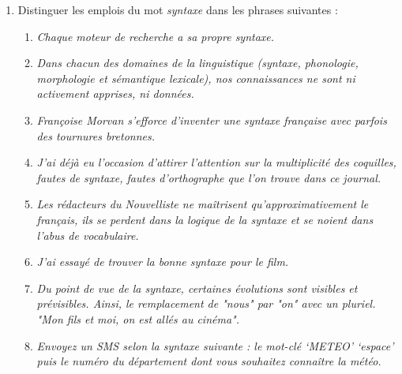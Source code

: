 {\begin{enumerate}[label=\alph*.]
    \item Distinguer les emplois du mot \textit{syntaxe} dans les phrases suivantes :

    \begin{enumerate}[label=(\arabic*),resume]
    \item \textit{Chaque moteur de recherche a sa propre syntaxe.}
    \item \textit{Dans chacun des domaines de la linguistique (syntaxe, phonologie, morphologie et sémantique lexicale), nos connaissances ne sont ni activement apprises, ni données.}
    \item \textit{Françoise Morvan s’efforce d’inventer une syntaxe française avec parfois des tournures bretonnes.}
    \item \textit{J’ai déjà eu l’occasion d’attirer l’attention sur la multiplicité des coquilles, fautes de syntaxe, fautes d’orthographe que l’on trouve dans ce journal.}
    \item \textit{Les rédacteurs du Nouvelliste ne maîtrisent qu’approximativement le français, ils se perdent dans la logique de la syntaxe et se noient dans l’abus de vocabulaire.}
    \item \textit{J’ai essayé de trouver la bonne syntaxe pour le film.}
    \item \textit{Du point de vue de la syntaxe, certaines évolutions sont visibles et prévisibles. Ainsi, le remplacement de "nous" par "on" avec un pluriel. "Mon fils et moi, on est allés au cinéma".}
    \item \textit{Envoyez un SMS selon la syntaxe suivante : le mot-clé ‘METEO’ ‘espace’ puis le numéro du département dont vous souhaitez connaître la météo.}
    \end{enumerate}
    \end{enumerate}
 }


